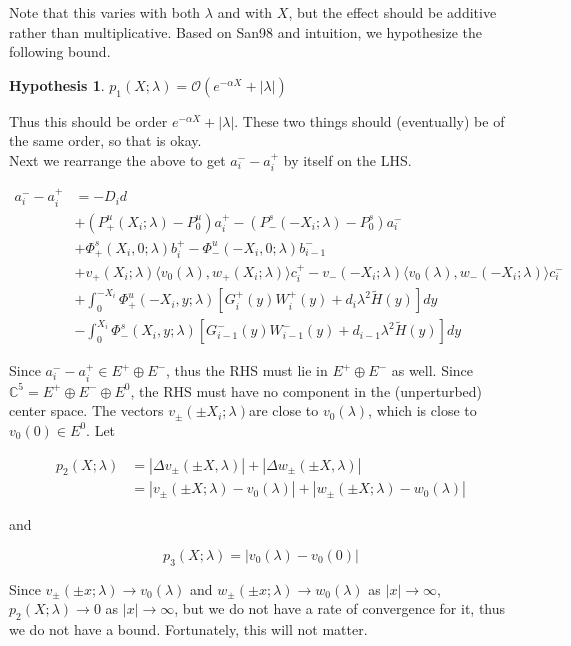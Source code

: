 \documentclass[12pt]{article}
\def\C{{\mathbb C}}
\newtheorem{hypothesis}{Hypothesis}
\begin{document}
Note that this varies with both $\lambda$ and with $X$, but the effect should be additive rather than multiplicative. Based on San98 and intuition, we hypothesize the following bound.

\begin{hypothesis}
$ p_1(X;\lambda) = \mathcal{O}( e^{-\alpha X} + |\lambda| )$
\end{hypothesis}

Thus this should be order $e^{-\alpha X} + |\lambda|$. These two things should (eventually) be of the same order, so that is okay.
\\

Next we rearrange the above to get $a_i^- - a_i^+$ by itself on the LHS.

\begin{align*}
a_i^- - a_i^+ &= -D_i d  \\
&+ (P^u_+(X_i; \lambda) - P_0^u)a_i^+ - (P^s_-(-X_i; \lambda) - P_0^s)a_i^- \\
&+ \Phi^s_+(X_i, 0; \lambda)b_i^+ - \Phi^u_-(-X_i, 0; \lambda)b_{i-1}^- \\
&+ v_+(X_i; \lambda) \langle v_0(\lambda), w_+(X_i; \lambda) \rangle c_i^+ - v_-(-X_i; \lambda) \langle v_0(\lambda), w_-(-X_i; \lambda) \rangle c_i^- \\
&+ \int_0^{-X_i} \Phi^u_+(-X_i, y; \lambda) [ G_i^+(y) W_i^+(y) + d_i \lambda^2 \tilde{H}(y) ] dy \\
&- \int_0^{X_i} \Phi^s_-(X_i, y; \lambda) [ G_{i-1}^-(y) W_{i-1}^-(y) + d_{i-1} \lambda^2 \tilde{H}(y) ] dy
\end{align*}

Since $a_i^- - a_i^+ \in E^+ \oplus E^-$, thus the RHS must lie in $E^+ \oplus E^-$ as well. Since $\C^5 = E^+ \oplus E^- \oplus E^0$, the RHS must have no component in the (unperturbed) center space. The vectors $v_\pm(\pm X_i; \lambda)$are close to $v_0(\lambda)$, which is close to $v_0(0) \in E^0$. Let

\begin{align*}
p_2(X; \lambda) &= |\Delta v_\pm(\pm X, \lambda)| + |\Delta w_\pm(\pm X, \lambda)|\\
&= |v_\pm(\pm X; \lambda) - v_0(\lambda)| + |w_\pm(\pm X; \lambda) - w_0(\lambda)|
\end{align*}

and

\[
p_3(X; \lambda) = |v_0(\lambda) - v_0(0)| 
\]

Since $v_\pm(\pm x; \lambda) \rightarrow v_0(\lambda)$ and $w_\pm(\pm x; \lambda) \rightarrow w_0(\lambda)$ as $|x| \rightarrow \infty$, $p_2(X; \lambda) \rightarrow 0$ as $|x| \rightarrow \infty$, but we do not have a rate of convergence for it, thus we do not have a bound. Fortunately, this will not matter.\\
\end{document}
